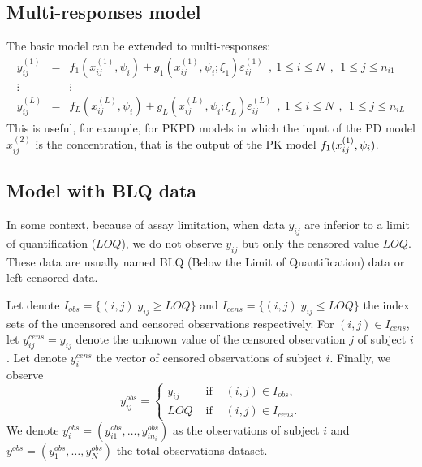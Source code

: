 \subsection{Multi-responses model} \label{section_model_multi}
The basic model can be extended to multi-responses:
\begin{eqnarray*}
y_{ij}^{(1)} &=& f_1(x_{ij}^{(1)} ,\psi_i)+ g_1(x_{ij}^{(1)} ,\psi_i;\xi_1)\varepsilon_{ij}^{(1)}  \ \ , \ 1\leq i \leq N \ \ , \ \ 1 \leq j \leq n_{i1} \\
\vdots &  & \vdots \\
y_{ij}^{(L)} &=& f_L(x_{ij}^{(L)} ,\psi_i)+ g_L(x_{ij}^{(L)} ,\psi_i;\xi_L)\varepsilon_{ij}^{(L)}  \ \ ,
\ 1\leq i \leq N \ \ , \ \ 1 \leq j \leq n_{iL}
\end{eqnarray*}
This is useful, for example, for PKPD models in which the input of
the PD model $x_{ij}^{(2)}$ is the concentration, that is the output
of the PK model $f_1(x_{ij}^{(1)} ,{\psi_i})$.



\subsection{Model with BLQ data} \label{section_model_blq}

In some context, because of assay limitation, when data $y_{ij}$ are inferior to a limit of quantification
($LOQ$), we do not observe $y_{ij}$ but only the censored value $LOQ$.    These data are usually named BLQ (Below the Limit of Quantification) data or left-censored data.

Let denote $I_{obs}=\{(i,j)|y_{ij}\geq LOQ\}$  and $I_{cens}=\{(i,j)|y_{ij}\leq LOQ\}$ the index
sets of  the uncensored and censored observations respectively. For $(i,j) \in I_{cens} $, let
$y_{ij}^{cens}=y_{ij} $ denote the unknown value of the censored observation $j$ of subject $i$.
Let denote $y_{i}^{cens}$ the vector of censored observations of subject $i$.
 Finally, we observe
\begin{equation*}
y_{ij}^{obs} = \left\{
\begin{array}{ccc}
y_{ij} & \mbox{ if  } & (i,j) \in I_{obs}, \\
LOQ & \mbox{ if } &(i,j) \in I_{cens}.
\end{array}
\right.
\end{equation*}
We denote $y_{i}^{obs}=(y_{i1}^{obs},\ldots,y_{in_i}^{obs})$ as the observations of subject $i$ and
$y^{obs}=(y_{1}^{obs},\ldots,y_{N}^{obs})$ the total observations dataset.

